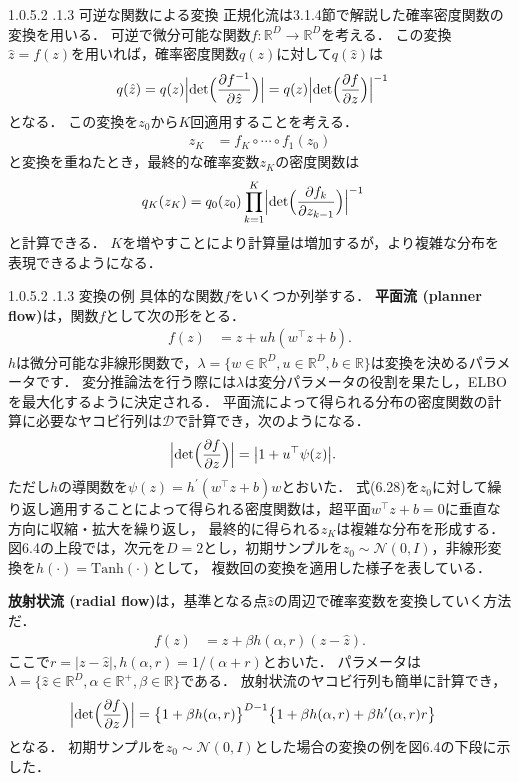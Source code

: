\documentclass[11pt,a4paper]{jsarticle}
\makeatletter
\numberwithin{equation}{section}
\newcommand{\subsubsubsection}{\@startsection{paragraph}{4}{\z@}%
	{1.0\Cvs \@plus.5\Cdp \@minus.2\Cdp}%
	{.1\Cvs \@plus.3\Cdp}%
	{\reset@font\sffamily\normalsize}
}
\makeatother
\begin{document}
\subsubsubsection{可逆な関数による変換}
正規化流は3.1.4節で解説した確率密度関数の変換を用いる．
可逆で微分可能な関数$f: \mathbb{R}^D \to \mathbb{R}^D$を考える．
この変換$\hat{z} = f(z)$を用いれば，確率密度関数$q(z)$に対して$q(\hat{z})$は
\begin{align}
q(\hat{z})
& =
q(z) \Bigl| \mathrm{det} \Bigl(\frac{\partial f^{-1}}{\partial \hat{z}} \Bigr) \Bigr|
= q(z) \Bigl| \mathrm{det} \Bigl(\frac{\partial f}{\partial z} \Bigr) \Bigr|^{-1}
\end{align}
となる．
この変換を$z_0$から$K$回適用することを考える．
\begin{align}
z_K
& =
f_K \circ \cdots \circ f_1 (z_0)
\end{align}
と変換を重ねたとき，最終的な確率変数$z_K$の密度関数は
\begin{align}
q_K(z_K)
& =
q_0(z_0) \prod_{k=1}^K \Bigl| \mathrm{det} \Bigl(\frac{\partial f_k}{\partial z_{k-1}} \Bigr) \Bigr|^{-1}
\end{align}
と計算できる．
$K$を増やすことにより計算量は増加するが，より複雑な分布を表現できるようになる．

\subsubsubsection{変換の例}
具体的な関数$f$をいくつか列挙する．
\textbf{平面流 (planner flow)}は，関数$f$として次の形をとる．
\begin{align}
f(z)
& =
z + u h(w^\top z + b).
\end{align}
$h$は微分可能な非線形関数で，$\lambda = \{ w \in \mathbb{R}^D, u \in \mathbb{R}^D, b \in \mathbb{R} \}$は変換を決めるパラメータです．
変分推論法を行う際には$\lambda$は変分パラメータの役割を果たし，ELBOを最大化するように決定される．
平面流によって得られる分布の密度関数の計算に必要なヤコビ行列は$\mathcal{D}$で計算でき，次のようになる．
\begin{align}
\Bigl| \mathrm{det} \Bigl(\frac{\partial f}{\partial z} \Bigr) \Bigr|
& =
\bigl| 1 + u^\top \psi(z) \bigr|.
\end{align}
ただし$h$の導関数を$\psi(z) = h^\prime ( w^\top z + b ) w$とおいた．
式(6.28)を$z_0$に対して繰り返し適用することによって得られる密度関数は，超平面$w^\top z + b = 0$に垂直な方向に収縮・拡大を繰り返し，
最終的に得られる$z_K$は複雑な分布を形成する．
図6.4の上段では，次元を$D = 2$とし，初期サンプルを$z_0 \sim \mathcal{N} (0, I)$，非線形変換を$h(\cdot) = \mathrm{Tanh}(\cdot)$として，
複数回の変換を適用した様子を表している．

\textbf{放射状流 (radial flow)}は，基準となる点$\hat{z}$の周辺で確率変数を変換していく方法だ．
\begin{align}
f(z)
& =
z + \beta h(\alpha, r)(z - \hat{z}).
\end{align}
ここで$r = | z - \hat{z} |, h(\alpha, r) = 1 / (\alpha + r)$とおいた．
パラメータは$\lambda = \{ \hat{z} \in \mathbb{R}^D, \alpha \in \mathbb{R}^+, \beta \in \mathbb{R} \}$である．
放射状流のヤコビ行列も簡単に計算でき，
\begin{align}
\Bigl| \mathrm{det} \Bigl(\frac{\partial f}{\partial z} \Bigr) \Bigr|
& =
\bigl\{ 1 + \beta h(\alpha, r) \bigr\}^{D - 1} \bigl\{ 1 + \beta h(\alpha, r) + \beta h^\prime(\alpha, r)r \bigr\}
\end{align}
となる．
初期サンプルを$z_0 \sim \mathcal{N} (0, I)$とした場合の変換の例を図6.4の下段に示した．
\end{document}
